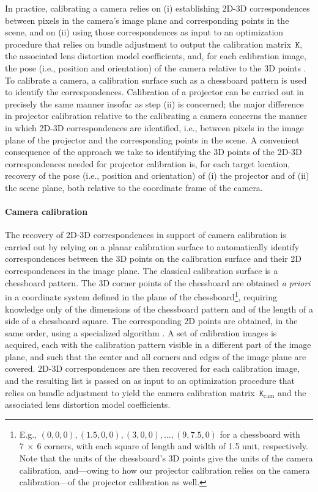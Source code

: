 \documentclass[review]{elsarticle}
\begin{document}
In practice, calibrating a camera relies on (i) establishing 2D-3D correspondences between pixels in the camera's image plane and corresponding points in the scene, and on (ii) using those correspondences as input to an optimization procedure that relies on bundle adjustment \cite{triggs1999bundle} to output the calibration matrix~$\mathtt{K}$, the associated lens distortion model coefficients, and, for each calibration image, the pose (i.e., position and orientation) of the camera relative to the 3D points \cite{Hartley2004,zhang2000flexible}. To calibrate a camera, a calibration surface such as a chessboard pattern is used to identify the correspondences. Calibration of a projector can be carried out in precisely the same manner insofar as step (ii) is concerned; the major difference in projector calibration relative to the calibrating a camera concerns the manner in which 2D-3D correspondences are identified, i.e., between pixels in the image plane of the projector and the corresponding points in the scene. A convenient consequence of the approach we take to identifying the 3D points of the 2D-3D correspondences needed for projector calibration is, for each target location, recovery of the pose (i.e., position and orientation) of (i) the projector and of (ii) the scene plane, both relative to the coordinate frame of the camera.

\paragraph{Camera calibration} The recovery of 2D-3D correspondences in support of camera calibration is carried out by relying on a planar calibration surface to automatically identify correspondences between the 3D points on the calibration surface and their 2D correspondences in the image plane. The classical calibration surface is a chessboard pattern. The 3D corner points of the chessboard are obtained \textit{a priori} in a coordinate system defined in the plane of the chessboard\footnote{E.g., $(0,0,0), (1.5,0,0), (3,0,0), \dots, (9,7.5,0)$ for a chessboard with $7~\times{}~6$ corners, with each square of length and width of 1.5 unit, respectively. Note that the units of the chessboard's 3D points give the units of the camera calibration, and---owing to how our projector calibration relies on the camera calibration---of the projector calibration as well.}, requiring knowledge only of the dimensions of the chessboard pattern and of the length of a side of a chessboard square. The corresponding 2D points are obtained, in the same order, using a specialized algorithm \cite{bradski2000opencv}. A set of calibration images is acquired, each with the calibration pattern visible in a different part of the image plane, and such that the center and all corners and edges of the image plane are covered. 2D-3D correspondences are then recovered for each calibration image, and the resulting list is passed on as input to an optimization procedure that relies on bundle adjustment to yield the camera calibration matrix~$\mathtt{K}_\text{cam}$ and the associated lens distortion model coefficients. 
\end{document}
